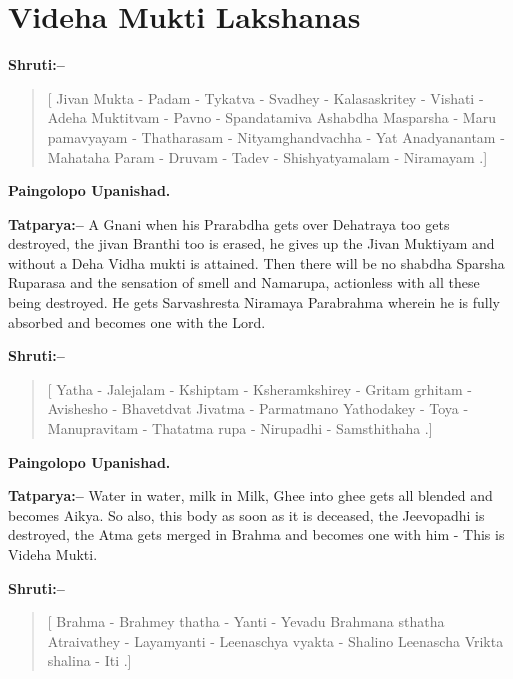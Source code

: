 \chapter{Videha Mukti Lakshanas}

\textbf{Shruti:–}

\begin{verse}
[ Jivan Mukta - Padam - Tykatva - Svadhey - Kala\break saskritey - Vishati - Adeha Muktitvam - Pavno - Spandatamiva  Ashabdha Masparsha - Maru pamavyayam - Thatharasam - Nityamghandvachha - Yat  Anadya\break nantam - Mahataha Param - Druvam - Tadev - Shishyatyamalam - Niramayam .]
\end{verse}

\begin{flushright}
\textbf{Paingolopo Upanishad.}
\end{flushright}

\textbf{Tatparya:–} A Gnani when his Prarabdha gets over Dehatraya too gets destroyed, the jivan Branthi too is erased, he gives up the Jivan Muktiyam and without a Deha Vidha mukti is attained. Then there will be no shabdha Sparsha Ruparasa and the sensation of smell and Namarupa, actionless with all these being destroyed. He gets Sarvashresta Niramaya Parabrahma wherein he is fully absorbed and becomes one with the Lord.

\textbf{Shruti:–}

\begin{verse}
[ Yatha - Jalejalam - Kshiptam - Ksheramkshirey - Gritam grhitam - Avishesho - Bhavetdvat Jivatma - Parmatmano  Yathodakey - Toya - Manupravitam - Thatatma rupa - Nirupadhi - Samsthithaha .]
\end{verse}

\begin{flushright}
\textbf{Paingolopo Upanishad.}
\end{flushright}

\textbf{Tatparya:–} Water in water, milk in Milk, Ghee into ghee gets all blended and becomes Aikya. So also, this body as soon as it is deceased, the Jeevopadhi is destroyed, the Atma gets merged in Brahma and becomes one with him - This is Videha Mukti.

\textbf{Shruti:–}

\begin{verse}
[ Brahma - Brahmey thatha - Yanti - Yevadu Brahmana sthatha  Atraivathey - Layamyanti - Leenaschya vyakta - Shalino  Leenascha Vrikta shalina - Iti .]
\end{verse}

